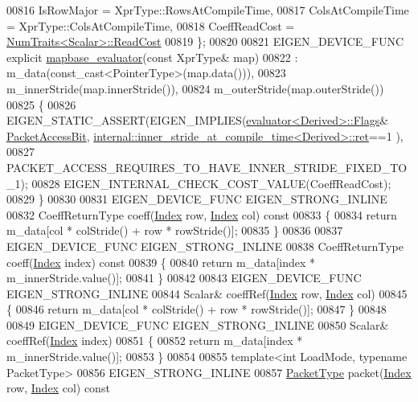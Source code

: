 \begin{DoxyCode}
00816     IsRowMajor = XprType::RowsAtCompileTime,
00817     ColsAtCompileTime = XprType::ColsAtCompileTime,
00818     CoeffReadCost = \hyperlink{group___core___module_struct_eigen_1_1_num_traits}{NumTraits<Scalar>::ReadCost}
00819   \};
00820 
00821   EIGEN\_DEVICE\_FUNC \textcolor{keyword}{explicit} \hyperlink{struct_eigen_1_1internal_1_1mapbase__evaluator}{mapbase\_evaluator}(\textcolor{keyword}{const} XprType& map)
00822     : m\_data(const\_cast<PointerType>(map.data())),
00823       m\_innerStride(map.innerStride()),
00824       m\_outerStride(map.outerStride())
00825   \{
00826     EIGEN\_STATIC\_ASSERT(EIGEN\_IMPLIES(\hyperlink{struct_eigen_1_1internal_1_1evaluator}{evaluator<Derived>::Flags}&
      \hyperlink{group__flags_ga1a306a438e1ab074e8be59512e887b9f}{PacketAccessBit}, 
      \hyperlink{struct_eigen_1_1internal_1_1inner__stride__at__compile__time}{internal::inner\_stride\_at\_compile\_time<Derived>::ret}==1
      ),
00827                         PACKET\_ACCESS\_REQUIRES\_TO\_HAVE\_INNER\_STRIDE\_FIXED\_TO\_1);
00828     EIGEN\_INTERNAL\_CHECK\_COST\_VALUE(CoeffReadCost);
00829   \}
00830 
00831   EIGEN\_DEVICE\_FUNC EIGEN\_STRONG\_INLINE
00832   CoeffReturnType coeff(\hyperlink{namespace_eigen_a62e77e0933482dafde8fe197d9a2cfde}{Index} row, \hyperlink{namespace_eigen_a62e77e0933482dafde8fe197d9a2cfde}{Index} col)\textcolor{keyword}{ const}
00833 \textcolor{keyword}{  }\{
00834     \textcolor{keywordflow}{return} m\_data[col * colStride() + row * rowStride()];
00835   \}
00836 
00837   EIGEN\_DEVICE\_FUNC EIGEN\_STRONG\_INLINE
00838   CoeffReturnType coeff(\hyperlink{namespace_eigen_a62e77e0933482dafde8fe197d9a2cfde}{Index} index)\textcolor{keyword}{ const}
00839 \textcolor{keyword}{  }\{
00840     \textcolor{keywordflow}{return} m\_data[index * m\_innerStride.value()];
00841   \}
00842 
00843   EIGEN\_DEVICE\_FUNC EIGEN\_STRONG\_INLINE
00844   Scalar& coeffRef(\hyperlink{namespace_eigen_a62e77e0933482dafde8fe197d9a2cfde}{Index} row, \hyperlink{namespace_eigen_a62e77e0933482dafde8fe197d9a2cfde}{Index} col)
00845   \{
00846     \textcolor{keywordflow}{return} m\_data[col * colStride() + row * rowStride()];
00847   \}
00848 
00849   EIGEN\_DEVICE\_FUNC EIGEN\_STRONG\_INLINE
00850   Scalar& coeffRef(\hyperlink{namespace_eigen_a62e77e0933482dafde8fe197d9a2cfde}{Index} index)
00851   \{
00852     \textcolor{keywordflow}{return} m\_data[index * m\_innerStride.value()];
00853   \}
00854 
00855   \textcolor{keyword}{template}<\textcolor{keywordtype}{int} LoadMode, \textcolor{keyword}{typename} PacketType>
00856   EIGEN\_STRONG\_INLINE
00857   \hyperlink{struct_eigen_1_1_packet_type}{PacketType} packet(\hyperlink{namespace_eigen_a62e77e0933482dafde8fe197d9a2cfde}{Index} row, \hyperlink{namespace_eigen_a62e77e0933482dafde8fe197d9a2cfde}{Index} col)\textcolor{keyword}{ const}

\end{DoxyCode}
